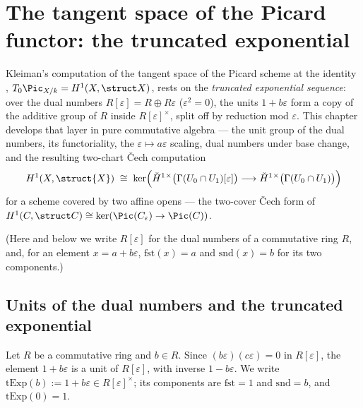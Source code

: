 \chapter{The tangent space of the Picard functor: the truncated exponential}
\label{chap:Tangent}

Kleiman's computation of the tangent space of the Picard scheme at the identity
\cite{kleiman-picard},
\(T_0 \Pic_{X/k} = H^1(X, \struct X)\), rests on the
\emph{truncated exponential sequence}: over the dual numbers
\(R[\varepsilon] = R \oplus R\varepsilon\) (\(\varepsilon^2 = 0\)), the units
\(1 + b\varepsilon\) form a copy of the additive group of \(R\) inside
\(R[\varepsilon]^\times\), split off by reduction mod \(\varepsilon\). This chapter
develops that layer in pure commutative algebra --- the unit group of the dual numbers,
its functoriality, the \(\varepsilon \mapsto a\varepsilon\) scaling, dual numbers under
base change, and the resulting two-chart \v{C}ech computation
\[
  H^1(X, \struct{X}) \;\cong\;
    \ker\Bigl( \check{H}^1{}^\times\bigl(\Gamma(U_0 \cap U_1)[\varepsilon]\bigr)
      \longrightarrow \check{H}^1{}^\times\bigl(\Gamma(U_0 \cap U_1)\bigr) \Bigr)
\]
for a scheme covered by two affine opens --- the two-cover \v{C}ech form of
\(H^1(C, \struct C) \cong \ker(\Pic(C_\varepsilon) \to \Pic(C))\).

(Here and below we write \(R[\varepsilon]\) for the dual numbers of a commutative ring
\(R\), and, for an element \(x = a + b\varepsilon\), \(\mathrm{fst}(x) = a\) and
\(\mathrm{snd}(x) = b\) for its two components.)

\section{Units of the dual numbers and the truncated exponential}

\begin{definition}
  \label{def:truncExpUnit}
  \leanok
  Let \(R\) be a commutative ring and \(b \in R\). Since
  \((b\varepsilon)(c\varepsilon) = 0\) in \(R[\varepsilon]\), the element
  \(1 + b\varepsilon\) is a unit of \(R[\varepsilon]\), with inverse
  \(1 - b\varepsilon\). We write
  \(\mathrm{tExp}(b) := 1 + b\varepsilon \in R[\varepsilon]^\times\); its components are
  \(\mathrm{fst} = 1\) and \(\mathrm{snd} = b\), and \(\mathrm{tExp}(0) = 1\).
\end{definition}

